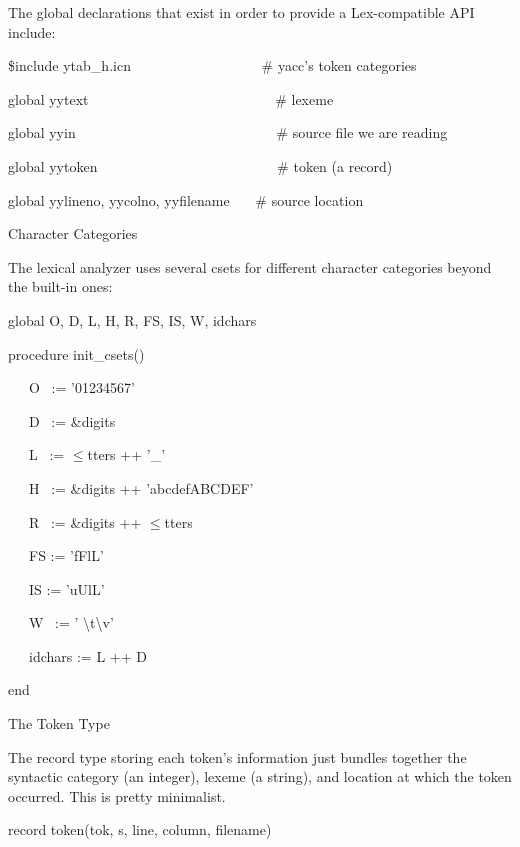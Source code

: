 The global declarations that exist in order to provide a
Lex-compatible API include:

{\ttfamily\mdseries
\$include {\textquotedbl}ytab\_h.icn{\textquotedbl} \ \ \ \ \ \ \ \ \ \ \ \ \ \ \ \ \ \ \# yacc's token categories}

{\ttfamily\mdseries
global yytext \ \ \ \ \ \ \ \ \ \ \ \ \ \ \ \ \ \ \ \ \ \ \ \ \ \ \# lexeme}

{\ttfamily\mdseries
global yyin \ \ \ \ \ \ \ \ \ \ \ \ \ \ \ \ \ \ \ \ \ \ \ \ \ \ \ \ \# source file we are reading}

{\ttfamily\mdseries
global yytoken \ \ \ \ \ \ \ \ \ \ \ \ \ \ \ \ \ \ \ \ \ \ \ \ \ \# token (a record)}

{\ttfamily\mdseries
global yylineno, yycolno, yyfilename \ \ \ \# source location}

{\sffamily
Character Categories }


The lexical analyzer uses several csets for different character
categories beyond the built-in ones:

{\ttfamily\mdseries
global O, D, L, H, R, FS, IS, W, idchars}


\bigskip

{\ttfamily\mdseries
procedure init\_csets()}

{\ttfamily\mdseries
\ \ \ O \ := '01234567'}

{\ttfamily\mdseries
\ \ \ D \ := \&digits}

{\ttfamily\mdseries
\ \ \ L \ := ${\leq}$tters ++ '\_'}

{\ttfamily\mdseries
\ \ \ H \ := \&digits ++ 'abcdefABCDEF'}

{\ttfamily\mdseries
\ \ \ R \ := \&digits ++ ${\leq}$tters}

{\ttfamily\mdseries
\ \ \ FS := 'fFlL'}

{\ttfamily\mdseries
\ \ \ IS := 'uUlL'}

{\ttfamily\mdseries
\ \ \ W \ := ' {\textbackslash}t{\textbackslash}v'}

{\ttfamily\mdseries
\ \ \ idchars := L ++ D}

{\ttfamily\mdseries
end}

{\sffamily
The Token Type }


The record type storing each token's information just bundles together
the syntactic category (an integer), lexeme (a string), and location
at which the token occurred. This is pretty minimalist.

{\ttfamily\mdseries
record token(tok, s, line, column, filename)}

